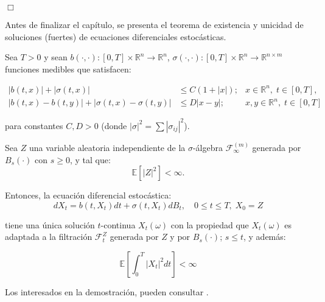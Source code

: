 \begin{flushright}
	$\Box$
\end{flushright}

Antes de finalizar el capítulo, se presenta el teorema de existencia y unicidad de soluciones (fuertes) de ecuaciones diferenciales estocásticas.

\begin{theorem}
	
	Sea $ T > 0 $ y sean \( b(\cdot,\cdot): [0,T] \times \mathbb{R}^{n} \to \mathbb{R}^{n} \), \( \sigma(\cdot,\cdot): [0,T] \times \mathbb{R}^{n} \to \mathbb{R}^{n \times m} \) 
funciones medibles que satisfacen:

\begin{align*}
|b(t,x)| + |\sigma(t,x)| &\leq C(1 + |x|); & x \in \mathbb{R}^{n},\; t \in [0,T], \\
|b(t,x) - b(t,y)| + |\sigma(t,x) - \sigma(t,y)| &\leq D|x - y|; & x,y \in \mathbb{R}^{n},\; t \in [0,T]
\end{align*}

para constantes \( C, D > 0 \) (donde \( |\sigma|^2 = \sum |\sigma_{ij}|^2 \)). 

Sea \( Z \) una variable aleatoria independiente de la \( \sigma \)-álgebra \( \mathscr{F}_{\infty}^{(m)} \) 
generada por \( B_s(\cdot) \) con \( s \geq 0 \), y tal que:
\[
\mathbb{E}[|Z|^2] < \infty.
\]

Entonces, la ecuación diferencial estocástica:
\[
dX_t = b(t,X_t) dt + \sigma(t,X_t) dB_t, \quad 0 \leq t \leq T, \; X_0 = Z 
\]

tiene una única solución \( t \)-continua \( X_t(\omega) \) con la propiedad que $X_t (\omega)$ es adaptada a la filtración $\mathcal{F}^Z_t$ generada por $Z$ y por $B_s (\cdot)$; $s \leq t$, y además:

\[
	\mathbb{E} \left[ \int_0^T \lvert X_t \rvert^2 dt \right] < \infty
\]


\end{theorem}


Los interesados en la demostración, pueden consultar \cite{EDE_Oksendal}.


